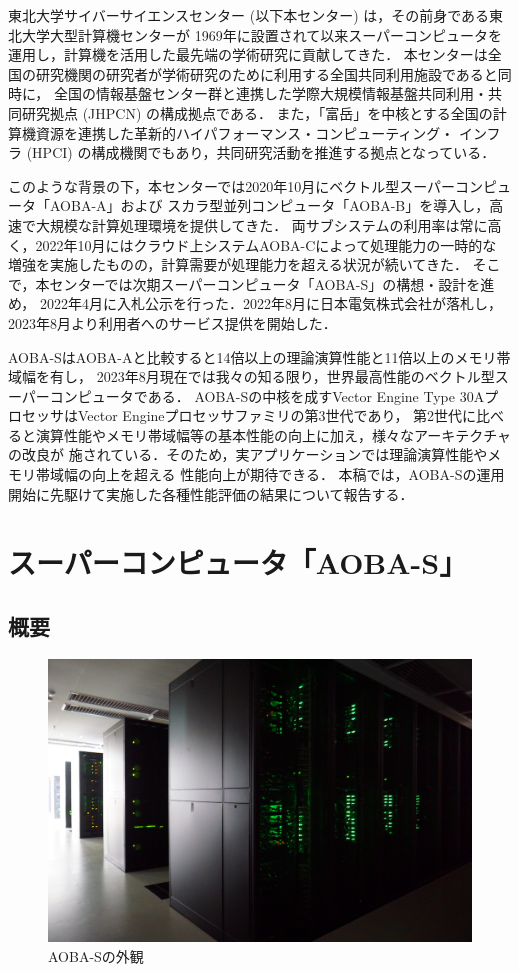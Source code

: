 ﻿\documentclass[submit,techrep,noauthor]{ipsj}
\begin{document}
東北大学サイバーサイエンスセンター (以下本センター) は，その前身である東北大学大型計算機センターが
1969年に設置されて以来スーパーコンピュータを運用し，計算機を活用した最先端の学術研究に貢献してきた．
本センターは全国の研究機関の研究者が学術研究のために利用する全国共同利用施設であると同時に，
全国の情報基盤センター群と連携した学際大規模情報基盤共同利用・共同研究拠点 (JHPCN) の構成拠点である．
また，「富岳」を中核とする全国の計算機資源を連携した革新的ハイパフォーマンス・コンピューティング・
インフラ (HPCI) の構成機関でもあり，共同研究活動を推進する拠点となっている．

このような背景の下，本センターでは2020年10月にベクトル型スーパーコンピュータ「AOBA-A」および
スカラ型並列コンピュータ「AOBA-B」を導入し，高速で大規模な計算処理環境を提供してきた．
両サブシステムの利用率は常に高く，2022年10月にはクラウド上システムAOBA-Cによって処理能力の一時的な
増強を実施したものの，計算需要が処理能力を超える状況が続いてきた．
そこで，本センターでは次期スーパーコンピュータ「AOBA-S」の構想・設計を進め，
2022年4月に入札公示を行った．2022年8月に日本電気株式会社が落札し，
2023年8月より利用者へのサービス提供を開始した．

AOBA-SはAOBA-Aと比較すると14倍以上の理論演算性能と11倍以上のメモリ帯域幅を有し，
2023年8月現在では我々の知る限り，世界最高性能のベクトル型スーパーコンピュータである．
AOBA-Sの中核を成すVector Engine Type 30AプロセッサはVector Engineプロセッサファミリの第3世代であり，
第2世代に比べると演算性能やメモリ帯域幅等の基本性能の向上に加え，様々なアーキテクチャの改良が
施されている．そのため，実アプリケーションでは理論演算性能やメモリ帯域幅の向上を超える
性能向上が期待できる．
本稿では，AOBA-Sの運用開始に先駆けて実施した各種性能評価の結果について報告する．

\section{スーパーコンピュータ「AOBA-S」}

\subsection{概要}

\begin{figure}[tb]
  \centering
  \includegraphics[width=.9\columnwidth]{figs/rack.jpg}
  \caption{AOBA-Sの外観}\label{fig:aoba-s}
\end{figure}
\end{document}
